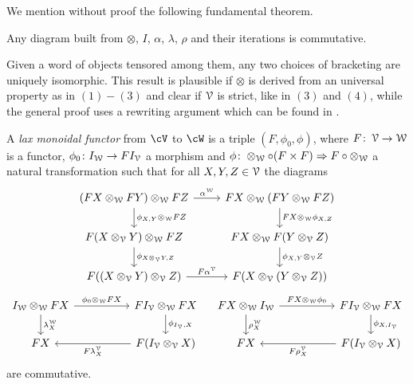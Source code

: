 \documentclass[a4paper,11pt,oneside,openany]{scrbook}
\begin{document}
We mention without proof the following fundamental theorem.

\begin{thm}
    Any diagram built from $\otimes$, $I$, $\alpha$, $\lambda$, $\rho$ and their iterations is commutative.
\end{thm}

    Given a word of objects tensored among them, any two choices of bracketing are uniquely isomorphic. This result is plausible if $\otimes$ is derived from an universal property as in $(1)-(3)$ and clear if $\operatorname{\mathcal{V}}$ is strict, like in $(3)$ and $(4)$, while the general proof uses a rewriting argument which can be found in \cite{MacLane2}.
    
\begin{defn}
    A \emph{lax monoidal functor} from $\cV$ to $\cW$ is a triple $(F,\phi_0,\phi)$, where $F\colon\operatorname{\mathcal{V}}\rightarrow\operatorname{\mathcal{W}}$ is a functor, $\phi_0\colon I_{\operatorname{\mathcal{W}}}\rightarrow FI_{\operatorname{\mathcal{V}}}$ a morphism and $\phi\colon\otimes_{\operatorname{\mathcal{W}}}\circ(F\times F)\Rightarrow F\circ\otimes_{\operatorname{\mathcal{W}}}$ a natural transformation such that for all $X,Y,Z\in\operatorname{\mathcal{V}}$ the diagrams
    \[
    \begin{tikzcd}
        (FX\otimes_{\W}FY)\otimes_{\W}FZ\ar[r, "\alpha^{\W}"]\ar[d, "\phi_{X,Y}\otimes_{\W}FZ"]
        & FX\otimes_{\W}(FY\otimes_{\W}FZ)\ar[d, "FX\otimes_{\W}\phi_{X,Z}"] \\
        F(X\otimes_{\V}Y)\otimes_{\W}FZ\ar[d, "\phi_{X\otimes_{\V}Y,Z}"]
        & FX\otimes_{\W}F(Y\otimes_{\V}Z)\ar[d, "\phi_{X,Y}\otimes_{\V}Z"] \\
        F((X\otimes_{\V}Y)\otimes_{\V}Z)\ar[r, "F\alpha^{\V}"]
        & F(X\otimes_{\V}(Y\otimes_{\V}Z))
    \end{tikzcd}
    \]
    \[
    \begin{tikzcd}[column sep=5.0em]
        I_{\W}\otimes_{\W}FX\ar[r, "\phi_0\otimes_{\W}FX"]\ar[d, "\lambda_X^{\W}"]
        & FI_{\V}\otimes_{\W}FX\ar[d, "\phi_{I_{\V},X}"] \\
        FX
        & F(I_{\V}\otimes_{\V}X)\ar[l, "F\lambda_X^{\V}"]
    \end{tikzcd}
    \quad
    \begin{tikzcd}[column sep=5.0em]
        FX\otimes_{\W}I_{\W}\ar[r, "FX\otimes_{\W}\phi_0"]\ar[d, "\rho_X^{\W}"]
        & FI_{\V}\otimes_{\W}FX\ar[d, "\phi_{X,I_{\V}}"] \\
        FX
        & F(I_{\V}\otimes_{\V}X)\ar[l, "F\rho_X^{\V}"]
    \end{tikzcd}
    \]
    are commutative.
    

\end{defn}
\end{document}

